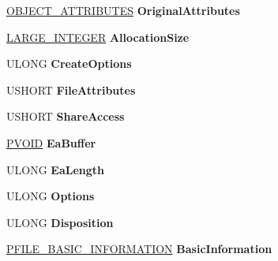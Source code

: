 \begin{DoxyCompactItemize}
\hyperlink{struct___o_b_j_e_c_t___a_t_t_r_i_b_u_t_e_s}{O\+B\+J\+E\+C\+T\+\_\+\+A\+T\+T\+R\+I\+B\+U\+T\+ES} {\bfseries Original\+Attributes}
\item 
\mbox{\label{struct___o_p_e_n___p_a_c_k_e_t_a0de04b451b7ec8d8696c0eba814a7b34}} 
\hyperlink{union___l_a_r_g_e___i_n_t_e_g_e_r}{L\+A\+R\+G\+E\+\_\+\+I\+N\+T\+E\+G\+ER} {\bfseries Allocation\+Size}
\item 
\mbox{\label{struct___o_p_e_n___p_a_c_k_e_t_adf788698447012bc1a9030f83262cc1d}} 
U\+L\+O\+NG {\bfseries Create\+Options}
\item 
\mbox{\label{struct___o_p_e_n___p_a_c_k_e_t_a5009c776c3aee5d962162fa3429fad17}} 
U\+S\+H\+O\+RT {\bfseries File\+Attributes}
\item 
\mbox{\label{struct___o_p_e_n___p_a_c_k_e_t_a72494704e03412cd237eb7bb60bee177}} 
U\+S\+H\+O\+RT {\bfseries Share\+Access}
\item 
\mbox{\label{struct___o_p_e_n___p_a_c_k_e_t_ae0ce54c51d146e75f2bcc51cacdc6b81}} 
\hyperlink{interfacevoid}{P\+V\+O\+ID} {\bfseries Ea\+Buffer}
\item 
\mbox{\label{struct___o_p_e_n___p_a_c_k_e_t_ae8e4ce48e701144c97d302d7d27be708}} 
U\+L\+O\+NG {\bfseries Ea\+Length}
\item 
\mbox{\label{struct___o_p_e_n___p_a_c_k_e_t_ab26d32a1df0689f3c6b7e60405825029}} 
U\+L\+O\+NG {\bfseries Options}
\item 
\mbox{\label{struct___o_p_e_n___p_a_c_k_e_t_aa84b7dd77cd28012c419023e570c1192}} 
U\+L\+O\+NG {\bfseries Disposition}
\item 
\mbox{\label{struct___o_p_e_n___p_a_c_k_e_t_a4e8c746f08dedd9349450f4a2b5d7b93}} 
\hyperlink{struct___f_i_l_e___b_a_s_i_c___i_n_f_o_r_m_a_t_i_o_n}{P\+F\+I\+L\+E\+\_\+\+B\+A\+S\+I\+C\+\_\+\+I\+N\+F\+O\+R\+M\+A\+T\+I\+ON} {\bfseries Basic\+Information}
\item 

\end{DoxyCompactItemize}
